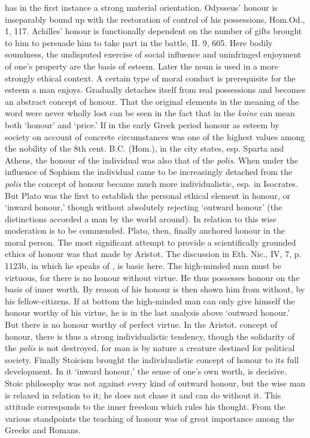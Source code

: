 \begin{compactdesc}
					\item[TDNT] \phantom{.}
						\begin{compactdesc}
							\item[8:170--171]  has in the first instance a strong material orientation. Odysseus' honour is inseparably bound up with the restoration of control of his possessions, Hom.Od., 1, 117. Achilles' honour is functionally dependent on the number of gifts brought to him to persuade him to take part in the battle, II. 9, 605. Here bodily soundness, the undisputed exercise of social influence and uninfringed enjoyment of one's property are the basis of esteem. Later the noun is used in a more strongly ethical context. A certain type of moral conduct is prerequisite for the esteem a man enjoys. Gradually  detaches itself from real possessions and becomes an abstract concept of honour. That the original elements in the meaning of the word were never wholly lost can be seen in the fact that in the \textit{koine}  can mean both `honour' and `price.' If in the early Greek period honour as esteem by society on account of concrete circumstances was one of the highest values among the nobility of the 8th cent. B.C. (Hom.), in the city states, esp. Sparta and Athens, the honour of the individual was also that of the \textit{polis}. When under the influence of Sophism the individual came to be increasingly detached from the \textit{polis} the concept of honour became much more individualistic, esp. in Isocrates. But Plato was the first to establish the personal ethical element in honour, or `inward honour,' though without absolutely rejecting `outward honour' (the distinctions accorded a man by the world around). In relation to this wise moderation is to be commended. Plato, then, finally anchored honour in the moral person. The most significant attempt to provide a scientifically grounded ethics of honour was that made by Aristot. The discussion in Eth. Nic., IV, 7, p. 1123b, in which he speaks of , is basic here. The high-minded man must be virtuous, for there is no honour without virtue. He thus possesses honour on the basis of inner worth. By reason of his  honour is then shown him from without, by his fellow-citizens. If at bottom the high-minded man can only give himself the honour worthy of his virtue, he is in the last analysis above `outward honour.' But there is no honour worthy of perfect virtue. In the Aristot. concept of honour, there is thus a strong individualistic tendency, though the solidarity of the \textit{polis} is not destroyed, for man is by nature a creature destined for political society. Finally Stoicism brought the individualistic concept of honour to its full development. In it `inward honour,' the sense of one's own worth, is decisive. Stoic philosophy was not against every kind of outward honour, but the wise man is relaxed in relation to it; he does not chase it and can do without it. This attitude corresponds to the inner freedom which rules his thought. From the various standpoints the teaching of honour was of great importance among the Greeks and Romans.

\end{compactdesc}
\end{compactdesc}

